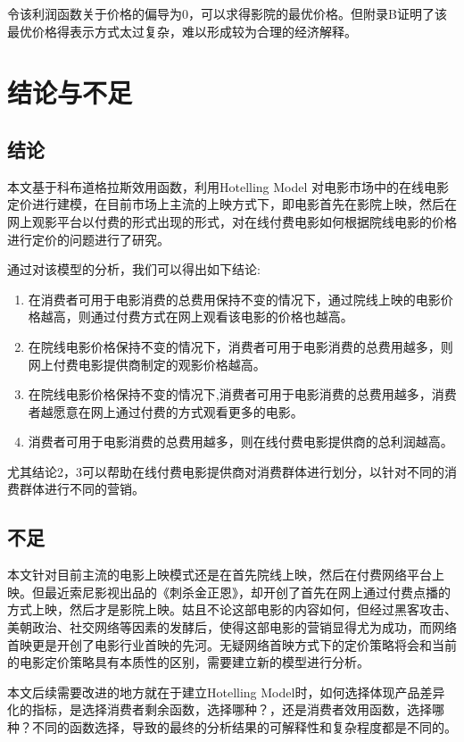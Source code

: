 \documentclass[paper=a4, fontsize=10.5pt]{scrartcl} %
\numberwithin{equation}{section} %
\numberwithin{figure}{section} %
\numberwithin{table}{section} %
\begin{document}
\begin{CJK}{UTF8}{gbsn}
令该利润函数关于价格的偏导为0，可以求得影院的最优价格。但附录B证明了该最优价格得表示方式太过复杂，难以形成较为合理的经济解释。

\section{结论与不足}
\subsection{结论}
本文基于科布道格拉斯效用函数，利用Hotelling Model 对电影市场中的在线电影定价进行建模，在目前市场上主流的上映方式下，即电影首先在影院上映，然后在网上观影平台以付费的形式出现的形式，对在线付费电影如何根据院线电影的价格进行定价的问题进行了研究。

通过对该模型的分析，我们可以得出如下结论:
\begin{enumerate}
	\item 在消费者可用于电影消费的总费用保持不变的情况下，通过院线上映的电影价格越高，则通过付费方式在网上观看该电影的价格也越高。
	\item 在院线电影价格保持不变的情况下，消费者可用于电影消费的总费用越多，则网上付费电影提供商制定的观影价格越高。
	\item 在院线电影价格保持不变的情况下,消费者可用于电影消费的总费用越多，消费者越愿意在网上通过付费的方式观看更多的电影。
	\item 消费者可用于电影消费的总费用越多，则在线付费电影提供商的总利润越高。
\end{enumerate}
尤其结论2，3可以帮助在线付费电影提供商对消费群体进行划分，以针对不同的消费群体进行不同的营销。

\subsection{不足}
本文针对目前主流的电影上映模式还是在首先院线上映，然后在付费网络平台上映。但最近索尼影视出品的《刺杀金正恩》，却开创了首先在网上通过付费点播的方式上映，然后才是影院上映。姑且不论这部电影的内容如何，但经过黑客攻击、美朝政治、社交网络等因素的发酵后，使得这部电影的营销显得尤为成功，而网络首映更是开创了电影行业首映的先河。无疑网络首映方式下的定价策略将会和当前的电影定价策略具有本质性的区别，需要建立新的模型进行分析。

本文后续需要改进的地方就在于建立Hotelling Model时，如何选择体现产品差异化的指标，是选择消费者剩余函数，选择哪种？，还是消费者效用函数，选择哪种？不同的函数选择，导致的最终的分析结果的可解释性和复杂程度都是不同的。





\end{CJK}
\end{document}
